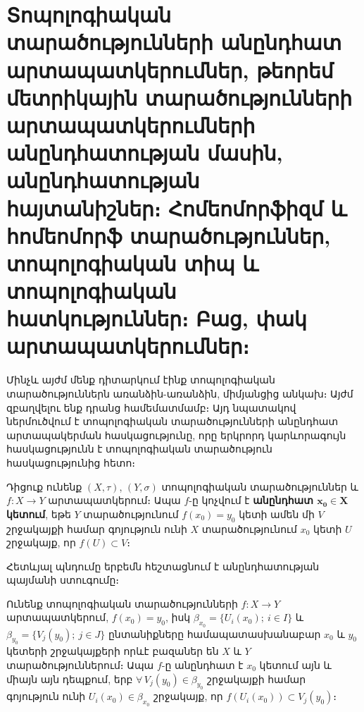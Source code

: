 \documentclass[./main.tex]{subfiles}
\begin{document}
\onehalfspacing
\section{Տոպոլոգիական տարածությունների անընդհատ արտա\-պատ\-կե\-րում\-ներ, թեորեմ մետրիկային տարածությունների արտա\-պատ\-կե\-րում\-ների անընդհատության մասին, անընդհատության հայտա\-նիշ\-ներ։ Հոմեոմորֆիզմ և հոմեոմորֆ տարածություններ, տոպո\-լո\-գիա\-կան տիպ և տոպոլոգիական հատկություններ։ Բաց, փակ արտա\-պատ\-կե\-րում\-ներ։}
\label{sec:9}

\par Մինչև այժմ մենք դիտարկում էինք տոպոլոգիական տարածություններն առան\-ձին-առանձին, միմյանցից անկախ։ Այժմ զբաղվելու ենք դրանց համեմատմամբ։ Այդ նպատակով ներմուծվում է տոպոլոգիական տարածությունների անընդհատ արտապակերման հասկացությունը, որը երկրորդ կարևորագույն հասկացությունն է տոպոլոգիական տարածություն հասկացությունից հետո։

\begin{definition}
Դիցուք ունենք $(X, \tau)$, $(Y, \sigma)$ տոպոլոգիական տարածություններ և ${f:X \rightarrow Y}$ արտապատկերում։ Ապա $f$-ը կոչվում է \textbf{անընդհատ $\boldsymbol{x_0\in X}$ կետում}, եթե $Y$ տարածությունում $f(x_0)=y_0$ կետի ամեն մի $V$ շրջակայքի համար գոյություն ունի $X$ տարածությունում $x_0$ կետի $U$ շրջակայք, որ $f(U)\subset V$։

\end{definition}
\par Հետևյալ պնդումը երբեմն հեշտացնում է անընդհատության պայմանի ստուգումը։

\begin{theorem}\label{ch9thm1} 
Ունենք տոպոլոգիական տարածությունների ${f:X \rightarrow Y}$ արտապատ\-կերում, $f(x_0)=y_{0}$, իսկ $\beta_{x_0}=\{U_i(x_0);\ i\in I\}$ և $\beta_{y_0}=\{V_j(y_0);\ j\in J\}$ ընտանիքները համապատասխանաբար $x_0$ և $y_0$ կետերի շրջակայքերի որևէ բազաներ են $X$ և $Y$ տարածություններում։ Ապա $f$-ը անընդհատ է $x_0$ կետում այն և միայն այն դեպքում, երբ $\forall\, V_j(y_0)\in \beta_{y_0}$ շրջակայքի համար գոյություն ունի $U_i(x_0)\in \beta_{x_0}$ շրջակայք, որ $f(U_i (x_0 ))\subset V_j(y_0)$։
\label{թեորեմ $1$}
\end{theorem}
\end{document}
